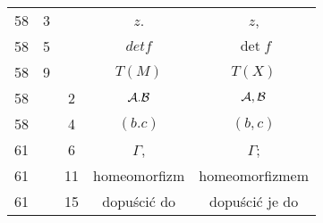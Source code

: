 \documentclass[a4paper,11pt]{article}
\begin{document}
\begin{center}
\begin{tabular}{|c|c|c|c|c|}
    58  & \hphantom{0}3 & & $z$. & $z$, \\
    58  & \hphantom{0}5 & & $det f$ & $\det f$ \\
    58  & \hphantom{0}9 & & $T( M )$ & $T( X )$ \\
    58  & & \hphantom{0}2 & $\mathcal{A}.\mathcal{B}$ & $\mathcal{A}, \mathcal{B}$ \\
    58  & & \hphantom{0}4 & $( b.c )$ & $( b, c )$ \\
    61  & & \hphantom{0}6 & $\Gamma$, & $\Gamma$; \\
    61  & & 11 & homeomorfizm & homeomorfizmem \\
    61  & & 15 & dopuścić do & dopuścić je do \\
    \hline
  \end{tabular}





  \newpage


\end{center}
\end{document}
